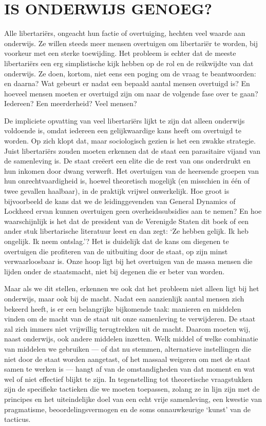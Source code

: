 \documentclass[
  a5paper,
  smalldemyvopaper,10pt,twoside,onecolumn,openright,extrafontsizes,hidelinks]{memoir}
\begin{document}
\section{IS ONDERWIJS GENOEG?}\label{is-onderwijs-genoeg}

Alle libertariërs, ongeacht hun factie of overtuiging, hechten veel
waarde aan onderwijs. Ze willen steeds meer mensen overtuigen om
libertariër te worden, bij voorkeur met een sterke toewijding. Het
probleem is echter dat de meeste libertariërs een erg simplistische kijk
hebben op de rol en de reikwijdte van dat onderwijs. Ze doen, kortom,
niet eens een poging om de vraag te beantwoorden: en daarna? Wat gebeurt
er nadat een bepaald aantal mensen overtuigd is? En hoeveel mensen
moeten er overtuigd zijn om naar de volgende fase over te gaan?
Iedereen? Een meerderheid? Veel mensen?

De impliciete opvatting van veel libertariërs lijkt te zijn dat alleen
onderwijs voldoende is, omdat iedereen een gelijkwaardige kans heeft om
overtuigd te worden. Op zich klopt dat, maar sociologisch gezien is het
een zwakke strategie. Juist libertariërs zouden moeten erkennen dat de
staat een parasitaire vijand van de samenleving is. De staat creëert een
elite die de rest van ons onderdrukt en hun inkomen door dwang verwerft.
Het overtuigen van de heersende groepen van hun onrechtvaardigheid is,
hoewel theoretisch mogelijk (en misschien in één of twee gevallen
haalbaar), in de praktijk vrijwel onwerkelijk. Hoe groot is bijvoorbeeld
de kans dat we de leidinggevenden van General Dynamics of Lockheed ervan
kunnen overtuigen geen overheidssubsidies aan te nemen? En hoe
waarschijnlijk is het dat de president van de Verenigde Staten dit boek
of een ander stuk libertarische literatuur leest en dan zegt: `Ze hebben
gelijk. Ik heb ongelijk. Ik neem ontslag.'? Het is duidelijk dat de kans
om diegenen te overtuigen die profiteren van de uitbuiting door de
staat, op zijn minst verwaarloosbaar is. Onze hoop ligt bij het
overtuigen van de massa mensen die lijden onder de staatsmacht, niet bij
degenen die er beter van worden.

Maar als we dit stellen, erkennen we ook dat het probleem niet alleen
ligt bij het onderwijs, maar ook bij de macht. Nadat een aanzienlijk
aantal mensen zich bekeerd heeft, is er een belangrijke bijkomende taak:
manieren en middelen vinden om de macht van de staat uit onze
samenleving te verwijderen. De staat zal zich immers niet vrijwillig
terugtrekken uit de macht. Daarom moeten wij, naast onderwijs, ook
andere middelen inzetten. Welk middel of welke combinatie van middelen
we gebruiken --- of dat nu stemmen, alternatieve instellingen die niet
door de staat worden aangetast, of het massaal weigeren om met de staat
samen te werken is --- hangt af van de omstandigheden van dat moment en
wat wel of niet effectief blijkt te zijn. In tegenstelling tot
theoretische vraagstukken zijn de specifieke tactieken die we moeten
toepassen, zolang ze in lijn zijn met de principes en het uiteindelijke
doel van een echt vrije samenleving, een kwestie van pragmatisme,
beoordelingsvermogen en de soms onnauwkeurige `kunst' van de tacticus.
\end{document}
